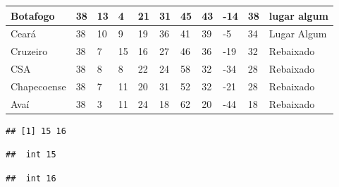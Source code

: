 \documentclass[
]{book}
\newenvironment{Shaded}{\begin{snugshade}}{\end{snugshade}}
\newcommand{\CommentTok}[1]{\textcolor[rgb]{0.56,0.35,0.01}{\textit{#1}}}
\newcommand{\FloatTok}[1]{\textcolor[rgb]{0.00,0.00,0.81}{#1}}
\newcommand{\FunctionTok}[1]{\textcolor[rgb]{0.00,0.00,0.00}{#1}}
\newcommand{\NormalTok}[1]{#1}
\newcommand{\OtherTok}[1]{\textcolor[rgb]{0.56,0.35,0.01}{#1}}
\newcommand{\SpecialCharTok}[1]{\textcolor[rgb]{0.00,0.00,0.00}{#1}}
\newcommand{\StringTok}[1]{\textcolor[rgb]{0.31,0.60,0.02}{#1}}
\begin{document}
\begin{table}
\begin{tabular}{l|l|l|l|l|l|l|l|l|l|l}
\hline
Botafogo & 38 & 13 & 4 & 21 & 31 & 45 & 43 & -14 & 38 & lugar algum\\
\hline
Ceará & 38 & 10 & 9 & 19 & 36 & 41 & 39 & -5 & 34 & Lugar Algum\\
\hline
Cruzeiro & 38 & 7 & 15 & 16 & 27 & 46 & 36 & -19 & 32 & Rebaixado\\
\hline
CSA & 38 & 8 & 8 & 22 & 24 & 58 & 32 & -34 & 28 & Rebaixado\\
\hline
Chapecoense & 38 & 7 & 11 & 20 & 31 & 52 & 32 & -21 & 28 & Rebaixado\\
\hline
Avaí & 38 & 3 & 11 & 24 & 18 & 62 & 20 & -44 & 18 & Rebaixado\\
\hline
\end{tabular}
\endgroup{}
\end{table}

\begin{Shaded}
\end{Shaded}

\begin{verbatim}
## [1] 15 16
\end{verbatim}

\begin{Shaded}
\end{Shaded}

\begin{verbatim}
##  int 15
\end{verbatim}

\begin{verbatim}
##  int 16
\end{verbatim}
\end{document}
